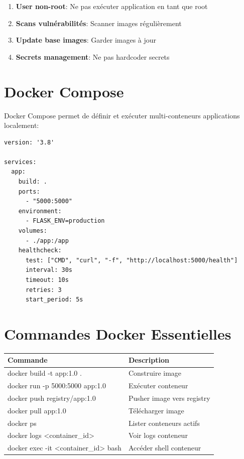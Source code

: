 \documentclass[12pt,a4paper]{report}
\begin{document}
\begin{enumerate}
    \item \textbf{User non-root}: Ne pas exécuter application en tant que root
    \item \textbf{Scans vulnérabilités}: Scanner images régulièrement
    \item \textbf{Update base images}: Garder images à jour
    \item \textbf{Secrets management}: Ne pas hardcoder secrets
\end{enumerate}

\section{Docker Compose}

Docker Compose permet de définir et exécuter multi-conteneurs applications localement:

\lstset{language=yaml}
\begin{lstlisting}
version: '3.8'

services:
  app:
    build: .
    ports:
      - "5000:5000"
    environment:
      - FLASK_ENV=production
    volumes:
      - ./app:/app
    healthcheck:
      test: ["CMD", "curl", "-f", "http://localhost:5000/health"]
      interval: 30s
      timeout: 10s
      retries: 3
      start_period: 5s
\end{lstlisting}

\section{Commandes Docker Essentielles}

\begin{table}[H]
\centering
\begin{tabularx}{\linewidth}{|l|X|}
\hline
\textbf{Commande} & \textbf{Description} \\
\hline
docker build -t app:1.0 . & Construire image \\
docker run -p 5000:5000 app:1.0 & Exécuter conteneur \\
docker push registry/app:1.0 & Pusher image vers registry \\
docker pull app:1.0 & Télécharger image \\
docker ps & Lister conteneurs actifs \\
docker logs <container\_id> & Voir logs conteneur \\
docker exec -it <container\_id> bash & Accéder shell conteneur \\
\hline
\end{tabularx}
\end{table}
\end{document}
